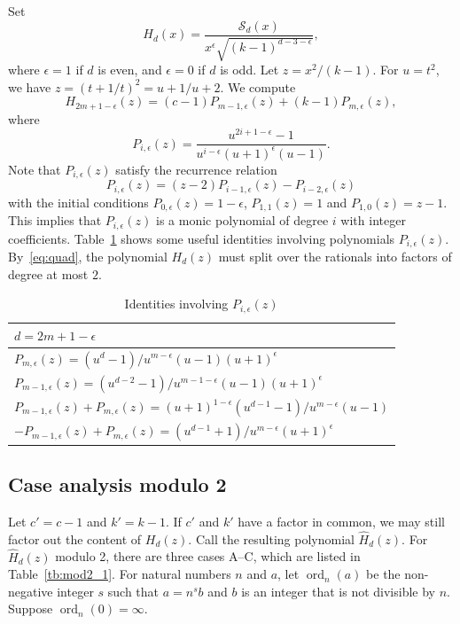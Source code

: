 \documentclass[ALCO,ThmDefs,Unicode,epreuves]{cedram}
\DeclareMathOperator{\ord}{ord}
\begin{document}
Set 
\[
H_d(x)=\frac{\mathscr{S}_d(x)}{x^\epsilon \sqrt{(k-1)^{d-3-\epsilon} }}, 
\]
where $\epsilon=1$ if $d$ is even, and $\epsilon=0$ if $d$ is odd. 
Let $z=x^2/(k-1)$. 
For $u=t^2$, we have $z=(t+1/t)^2=u+1/u+2$. We compute
\[
H_{2m+1-\epsilon}(z)=(c-1) P_{m-1,\epsilon}(z)+(k-1) P_{m,\epsilon}(z),
\]
where 
\[
P_{i,\epsilon}(z)=
\frac{ u^{2i+1-\epsilon}-1}
{u^{i-\epsilon}(u+1)^{\epsilon}(u-1)}. 
\] 
Note that $P_{i,\epsilon}(z)$ satisfy the recurrence relation
\[
P_{i,\epsilon}(z)=(z-2) P_{i-1,\epsilon}(z)-P_{i-2,\epsilon}(z)
\]
with the initial conditions $P_{0,\epsilon}(z)=1-\epsilon$, $P_{1,1}(z)=1$ and $P_{1,0}(z)=z-1$. This implies that 
$P_{i,\epsilon}(z)$ is a monic polynomial of degree $i$ 
with integer coefficients. 
Table~\ref{tb:prop_P} shows some useful identities 
involving polynomials $P_{i,\epsilon}(z)$. 
By~\eqref{eq:quad}, the polynomial $H_{d}(z)$ must split over the rationals into factors of degree at most $2$.

\begin{table}[htb] \centering
\caption{Identities involving $P_{i,\epsilon}(z)$} \label{tb:prop_P}
\renewcommand{\arraystretch}{1.3}
\begin{tabular}{|l|} 
\hline
$d=2m+1-\epsilon$ \\ 
\hline
$P_{m,\epsilon}(z)= (u^d-1)/u^{m-\epsilon} (u-1) (u+1)^\epsilon $\\
$P_{m-1,\epsilon}(z)= (u^{d-2}-1)/u^{m-1-\epsilon} (u-1) (u+1)^\epsilon$\\
$P_{m-1,\epsilon}(z)+P_{m,\epsilon}(z)=(u+1)^{1-\epsilon}(u^{d-1}-1)/u^{m-\epsilon} (u-1) $ \\
$-P_{m-1,\epsilon}(z)+P_{m,\epsilon}(z)= (u^{d-1}+1)/u^{m-\epsilon} (u+1)^\epsilon$ \\
\hline
\end{tabular}
\end{table}

\subsection{Case analysis modulo 2}

Let $c'=c-1$ and $k'=k-1$. If $c'$ and $k'$ have a factor in common, we may still factor out the content of $H_d(z)$. Call the resulting polynomial $\hat{H}_d(z)$. For $\hat{H}_d(z)$ modulo 2, there are three cases A--C, which are listed in Table~\ref{tb:mod2_1}. 
For natural numbers $n$ and $a$, let $\ord_n(a)$ be the non-negative integer $s$ such that $a=n^s b$ and 
$b$ is an integer that is not divisible by $n$. Suppose $\ord_n(0)= \infty$. 
\end{document}
